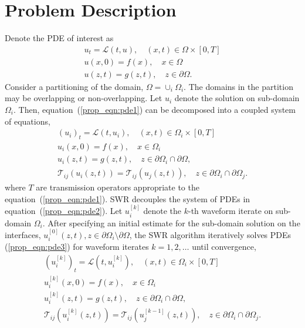 \documentclass{svmult-ddm}
\begin{document}
\section{Problem Description}
\label{prop_sec:waveform}

Denote the PDE of interest as 
\begin{eqnarray}
  \label{prop_eqn:pde1}
  u_t =  \mathcal{L}(t,u), \quad (x,t)\in \Omega\times[0,T]\\
  \nonumber
  u(x,0) = f(x), \quad x \in \Omega \\
  \nonumber
  u(z,t) = g(z,t), \quad z \in \partial\Omega. 
\end{eqnarray}
Consider a partitioning of the domain, $\Omega = \cup_i\Omega_i$.
The domains in the partition may be overlapping or non-overlapping.
Let $u_i$ denote the solution on sub-domain $\Omega_i$.
Then, equation~(\ref{prop_eqn:pde1}) can be decomposed into a
coupled system of equations,
\begin{eqnarray}
  \label{prop_eqn:pde2}
  (u_i)_t =  \mathcal{L}(t,u_i), \quad (x,t)\in \Omega_i\times[0,T]\\
  \nonumber
  u_i(x,0) = f(x), \quad x \in \Omega_i \\
  \nonumber
  u_i(z,t) = g(z,t), \quad z \in \partial\Omega_i\cap\partial\Omega, \\
  \nonumber
  \mathcal{T}_{ij}(u_{i}(z,t)) = \mathcal{T}_{ij}(u_{j}(z,t)), \quad z \in \partial\Omega_i\cap\partial\Omega_j.
\end{eqnarray}
where $T$ are transmission operators appropriate to the
equation~(\ref{prop_eqn:pde1}).  SWR decouples the system of
PDEs in equation~(\ref{prop_eqn:pde2}).  Let $u_i^{[k]}$
denote the $k$-th waveform iterate on sub-domain $\Omega_i$. After
specifying an initial estimate for the sub-domain solution on the
interfaces, $u_i^{[0]}(z,t),
z\in\partial\Omega_i\setminus\partial\Omega$, the SWR algorithm
iteratively solves PDEs (\ref{prop_eqn:pde3}) for waveform
iterates $k=1,2,\ldots$ until convergence,
\begin{eqnarray}
  \label{prop_eqn:pde3}
  (u_i^{[k]})_t =  \mathcal{L}(t,u_i^{[k]}), \quad (x,t)\in \Omega_i\times[0,T]\\
  \nonumber
  u_i^{[k]}(x,0) = f(x), \quad x \in \Omega_i \\
  \nonumber
  u_i^{[k]}(z,t) = g(z,t), \quad z \in \partial\Omega_i\cap\partial\Omega, \\
  \nonumber
  \mathcal{T}_{ij}(u_{i}^{[k]}(z,t)) = \mathcal{T}_{ij}(u_{j}^{[k-1]}(z,t)), \quad z \in \partial\Omega_i\cap\partial\Omega_j.
\end{eqnarray}
\end{document}
